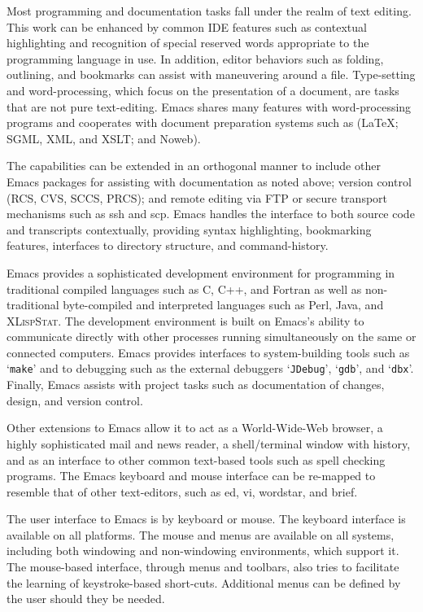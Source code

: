 \documentclass{article}
\newcommand*{\XLispStat}{\textsc{XLispStat}}
\newcommand{\stexttt}[1]{{\small\texttt{#1}}}
\newcommand{\file}[1]{`\stexttt{#1}'}
\begin{document}
Most programming and documentation tasks fall under the realm of text
editing.  This work can be enhanced by common IDE features such as
contextual highlighting and recognition of special reserved words
appropriate to the programming language in use.  In addition, editor
behaviors such as folding, outlining, and bookmarks can assist with
maneuvering around a file.  Type-setting and word-processing, which
focus on the presentation of a document, are tasks that are not pure
text-editing.  Emacs shares many features with word-processing
programs and cooperates with document preparation systems such as
(\LaTeX; SGML, XML, and XSLT; and Noweb).

The capabilities can be extended in an orthogonal manner to include
other Emacs packages for assisting with documentation as noted above;
version control (RCS, CVS, SCCS, PRCS); and remote editing via FTP or
secure transport mechanisms such as ssh and scp.  Emacs handles the
interface to both source code and transcripts contextually, providing
syntax highlighting, bookmarking features, interfaces to directory
structure, and command-history.

Emacs provides a sophisticated development environment for programming
in traditional compiled languages such as C, C++, and Fortran as well
as non-traditional byte-compiled and interpreted languages such as
Perl, Java, and \XLispStat.  The development environment is built on
Emacs's ability to communicate directly with other processes running
simultaneously on the same or connected computers.  Emacs provides
interfaces to system-building tools such as \file{make} and to
debugging such as the external debuggers \file{JDebug}, \file{gdb},
and \file{dbx}.  Finally, Emacs assists with project tasks such as
documentation of changes, design, and version control.

Other extensions to Emacs allow it to act as a World-Wide-Web browser,
a highly sophisticated mail and news reader, a shell/terminal window
with history, and as an interface to other common text-based tools
such as spell checking programs.  The Emacs keyboard and mouse
interface can be re-mapped to resemble that of other text-editors,
such as ed, vi, wordstar, and brief.

The user interface to Emacs is by keyboard or mouse.  The keyboard
interface is available on all platforms.  The mouse and menus are
available on all systems, including both windowing and non-windowing
environments, which support it.  The mouse-based interface, through
menus and toolbars, also tries to facilitate the learning of
keystroke-based short-cuts.  Additional menus can be defined by the
user should they be needed.
\end{document}
